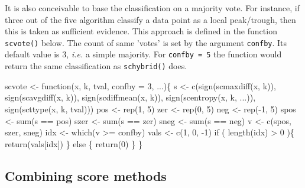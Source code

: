 \documentclass[a4paper]{article}
\begin{document}
It is also conceivable to base the classification on a majority
vote. For instance, if three out of the five algorithm classify a data
point as a local peak/trough, then this is taken as sufficient
evidence. This approach is defined in the function \verb?scvote()? below.
The count of same 'votes' is set by the argument \texttt{confby}. Its
default value is $3$, \emph{i.e.} a simple majority. For
\texttt{confby = 5} the function would return the same classification
as \verb?schybrid()? does.

\nwenddocs{}\endmoddef
scvote <- function(x, k, tval, confby = 3, ...)\{
    s <- c(sign(scmaxdiff(x, k)),
           sign(scavgdiff(x, k)),
           sign(scdiffmean(x, k)),
           sign(scentropy(x, k, ...)),
           sign(scttype(x, k, tval)))
    pos <- rep(1, 5)
    zer <- rep(0, 5)
    neg <- rep(-1, 5)
    spos <- sum(s == pos)
    szer <- sum(s == zer)
    sneg <- sum(s == neg)
    v <- c(spos, szer, sneg)
    idx <- which(v >= confby)
    vals <- c(1, 0, -1)
    if ( length(idx) > 0 )\{
        return(vals[idx])
    \} else \{
        return(0)
    \}
\}
\eatline
{}\nwendcode{}%

\subsection{Combining score methods}
\end{document}

